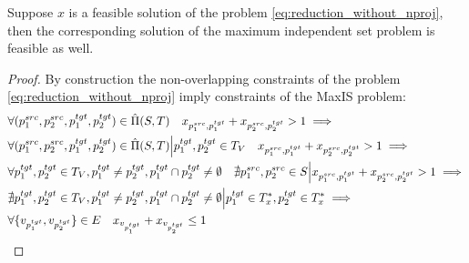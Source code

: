 \begin{lemma} \label{lemma:ilp_f_implies_maxis}
  Suppose \( x \) is a feasible solution of the problem \eqref{eq:reduction_without_nproj}, then
  the corresponding solution of the maximum independent set problem is feasible as well.
\end{lemma}
\begin{proof} By construction the non-overlapping constraints of the problem \eqref{eq:reduction_without_nproj}
  imply constraints of the MaxIS problem:
  \begin{align*}
    & \forall (p_1^{src}, p_2^{src}, p_1^{tgt}, p_2^{tgt}) \in \hat{\Pi}(S, T) \quad
    x_{p_1^{src}, p_1^{tgt}} + x_{p_2^{src}, p_2^{tgt}} > 1 \implies                                                     \\
    & \forall (p_1^{src}, p_2^{src}, p_1^{tgt}, p_2^{tgt}) \in \hat{\Pi}(S, T) \Big| p_1^{tgt}, p_2^{tgt} \in T_V \quad
    x_{p_1^{src}, p_1^{tgt}} + x_{p_2^{src}, p_2^{tgt}} > 1 \implies                                                     \\
    & \forall p_1^{tgt}, p_2^{tgt} \in T_V, p_1^{tgt} \neq p_2^{tgt}, p_1^{tgt} \cap p_2^{tgt} \neq \emptyset
    \quad \nexists p_1^{src}, p_2^{src} \in S \Big|
    x_{p_1^{src}, p_1^{tgt}} + x_{p_2^{src}, p_2^{tgt}} > 1 \implies                                                     \\
    & \nexists p_1^{tgt}, p_2^{tgt} \in T_V, p_1^{tgt} \neq p_2^{tgt}, p_1^{tgt} \cap p_2^{tgt} \neq \emptyset \Big|
    p_1^{tgt} \in T^*_x, p_2^{tgt} \in T^*_x \implies                                                                    \\
    & \forall \{ v_{p_1^{tgt}}, v_{p_2^{tgt}} \} \in E \quad x_{v_{p_1^{tgt}}} + x_{v_{p_2^{tgt}}}\leq 1
  \end{align*}
\end{proof}

